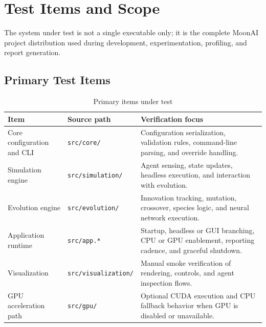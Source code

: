 \section{Test Items and Scope}
\label{sec:items}

The system under test is not a single executable only; it is the complete MoonAI project
distribution used during development, experimentation, profiling, and report generation.

\subsection{Primary Test Items}

\begin{table}[H]
	\centering
	\caption{Primary items under test}
	\label{tab:test-items}
	\begin{tabularx}{\textwidth}{@{}>{\ttfamily\small}l>{\ttfamily\small}lX@{}}
		\toprule
		\textbf{Item}              & \textbf{Source path}                & \textbf{Verification focus}                                                                          \\
		\midrule
		Core configuration and CLI & \texttt{src/core/}                  & Configuration serialization, validation rules, command-line parsing, and override handling.          \\
		Simulation engine          & \texttt{src/simulation/}            & Agent sensing, state updates, headless execution, and interaction with evolution.                    \\
		Evolution engine           & \texttt{src/evolution/}             & Innovation tracking, mutation, crossover, species logic, and neural network execution.               \\
		Application runtime        & \texttt{src/app.*}                  & Startup, headless or GUI branching, CPU or GPU enablement, reporting cadence, and graceful shutdown. \\
		Visualization              & \texttt{src/visualization/}         & Manual smoke verification of rendering, controls, and agent inspection flows.                        \\
		GPU acceleration path      & \texttt{src/gpu/}                   & Optional CUDA execution and CPU fallback behavior when GPU is disabled or unavailable.               \\

\end{tabularx}
\end{table}
